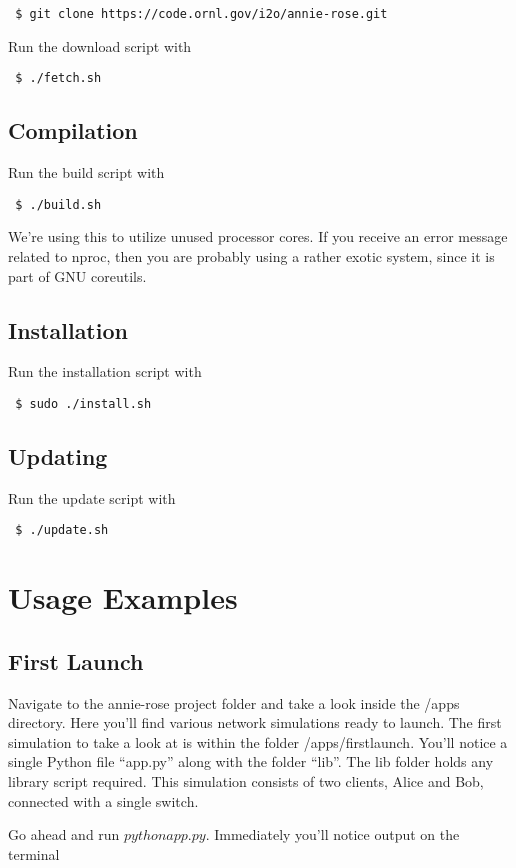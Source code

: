 \documentclass[letterpaper,twoside=false]{scrbook}
\newcommand{\code}[1]{\texttt{#1}}
\begin{document}
 		\code{
 		\$ git clone https://code.ornl.gov/i2o/annie-rose.git}
 		
 		Run the download script with
 		
 		\code{
 		\$ ./fetch.sh
 		}
 
 	\section{Compilation}
 		
 		Run the build script with
 		
 		\code{
 		\$ ./build.sh
 		}
 		
 	 	We're using this to utilize unused processor cores. If you receive an error message related to nproc, then you are probably using a rather exotic system, since it is part of GNU coreutils.

	\section{Installation}
	
		Run the installation script with
	
		\code{
		\$ sudo ./install.sh
		}

	\section{Updating}
	
		Run the update script with
		
		\code{
		\$ ./update.sh
		}
		
\chapter{Usage Examples}
	\section{First Launch}
		Navigate to the annie-rose project folder and take a look inside the /apps directory. Here you'll find various network simulations ready to launch. The first simulation to take a look at is within the folder /apps/firstlaunch. You'll notice a single Python file ``app.py'' along with the folder ``lib''. The lib folder holds any library script required. This simulation consists of two clients, Alice and Bob, connected with a single switch. 
		
		Go ahead and run $python app.py$. Immediately you'll notice output on the terminal
\end{document}

